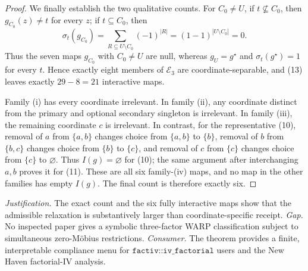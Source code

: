 \documentclass{article}
\begin{document}
\begin{proof}
We finally establish the two qualitative counts.  For \(C_0\ne U\), if \(t\not\subseteq C_0\), then \(g_{C_0}(z)\ne t\) for every \(z\); if \(t\subseteq C_0\), then
\[
\sigma_t(g_{C_0})
=\sum_{R\subseteq U\setminus C_0}(-1)^{|R|}
=(1-1)^{|U\setminus C_0|}=0. \tag{14}
\]
Thus the seven maps \(g_{C_0}\) with \(C_0\ne U\) are null, whereas \(g_U=g^\star\) and \(\sigma_t(g^\star)=1\) for every \(t\).  Hence exactly eight members of \(\mathcal E_3\) are coordinate-separable, and (13) leaves exactly \(29-8=21\) interactive maps.

Family (i) has every coordinate irrelevant.  In family (ii), any coordinate distinct from the primary and optional secondary singleton is irrelevant.  In family (iii), the remaining coordinate \(c\) is irrelevant.  In contrast, for the representative (10), removal of \(a\) from \(\{a,b\}\) changes choice from \(\{a,b\}\) to \(\{b\}\), removal of \(b\) from \(\{b,c\}\) changes choice from \(\{b\}\) to \(\{c\}\), and removal of \(c\) from \(\{c\}\) changes choice from \(\{c\}\) to \(\varnothing\).  Thus \(I(g)=\varnothing\) for (10); the same argument after interchanging \(a,b\) proves it for (11).  These are all six family-(iv) maps, and no map in the other families has empty \(I(g)\).  The final count is therefore exactly six.
\end{proof}
\par\smallskip\noindent \textit{Justification.} The exact count and the six fully interactive maps show that the admissible relaxation is substantively larger than coordinate-specific receipt. \textit{Gap.} No inspected paper gives a symbolic three-factor WARP classification subject to simultaneous zero-Möbius restrictions. \textit{Consumer.} The theorem provides a finite, interpretable compliance menu for \(\texttt{factiv::iv\_factorial}\) users and the New Haven factorial-IV analysis.
\end{document}
